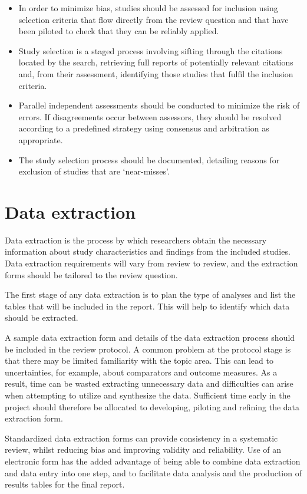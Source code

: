 \documentclass[
  10pt,
  a4paper,
  DIV=11,
  numbers=noendperiod]{scrreprt}
\begin{document}
\begin{itemize}
\item
  In order to minimize bias, studies should be assessed for inclusion
  using selection criteria that flow directly from the review question
  and that have been piloted to check that they can be reliably applied.
\item
  Study selection is a staged process involving sifting through the
  citations located by the search, retrieving full reports of
  potentially relevant citations and, from their assessment, identifying
  those studies that fulfil the inclusion criteria.
\item
  Parallel independent assessments should be conducted to minimize the
  risk of errors. If disagreements occur between assessors, they should
  be resolved according to a predefined strategy using consensus and
  arbitration as appropriate.
\item
  The study selection process should be documented, detailing reasons
  for exclusion of studies that are `near-misses'.
\end{itemize}

\section{Data extraction}\label{data-extraction}

Data extraction is the process by which researchers obtain the necessary
information about study characteristics and findings from the included
studies. Data extraction requirements will vary from review to review,
and the extraction forms should be tailored to the review question.

The first stage of any data extraction is to plan the type of analyses
and list the tables that will be included in the report. This will help
to identify which data should be extracted.

A sample data extraction form and details of the data extraction process
should be included in the review protocol. A common problem at the
protocol stage is that there may be limited familiarity with the topic
area. This can lead to uncertainties, for example, about comparators and
outcome measures. As a result, time can be wasted extracting unnecessary
data and difficulties can arise when attempting to utilize and
synthesize the data. Sufficient time early in the project should
therefore be allocated to developing, piloting and refining the data
extraction form.

Standardized data extraction forms can provide consistency in a
systematic review, whilst reducing bias and improving validity and
reliability. Use of an electronic form has the added advantage of being
able to combine data extraction and data entry into one step, and to
facilitate data analysis and the production of results tables for the
final report.
\end{document}

